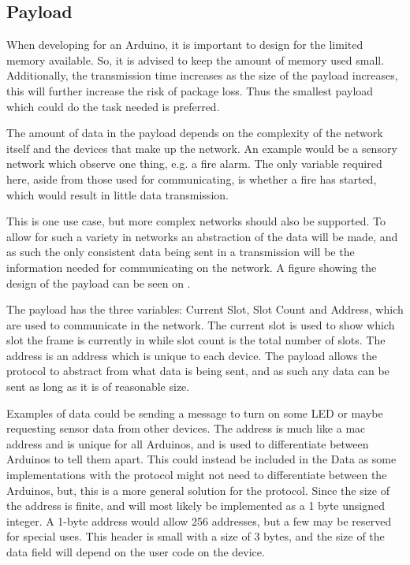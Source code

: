 \subsection{Payload}
When developing for an Arduino, it is important to design for the limited memory available.
So, it is advised to keep the amount of memory used small.
Additionally, the transmission time increases as the size of the payload increases, this will further increase the risk of package loss. 
Thus the smallest payload which could do the task needed is preferred.
 
The amount of data in the payload depends on the complexity of the network itself and the devices that make up the network.
An example would be a sensory network which observe one thing, e.g. a fire alarm. 
The only variable required here, aside from those used for communicating, is whether a fire has started, which would result in little data transmission.

This is one use case, but more complex networks should also be supported. 
To allow for such a variety in networks an abstraction of the data will be made, and as such the only consistent data being sent in a transmission will be the information needed for communicating on the network.
A figure showing the design of the payload can be seen on .


\noindent%
The payload has the three variables: Current Slot, Slot Count and Address, which are used to communicate in the network.
The current slot is used to show which slot the frame is currently in while slot count is the total number of slots.
The address is an address which is unique to each device. 
The payload allows the protocol to abstract from what data is being sent, and as such any data can be sent as long as it is of reasonable size. 

Examples of data could be sending a message to turn on some LED or maybe requesting sensor data from other devices.
The address is much like a mac address and is unique for all Arduinos, and is used to differentiate between Arduinos to tell them apart.
This could instead be included in the Data as some implementations with the protocol might not need to differentiate between the Arduinos, but, this is a more general solution for the protocol.
Since the size of the address is finite, and will most likely be implemented as a 1 byte unsigned integer. 
A 1-byte address would allow 256 addresses, but a few may be reserved for special uses.
This header is small with a size of 3 bytes, and the size of the data field will depend on the user code on the device.
